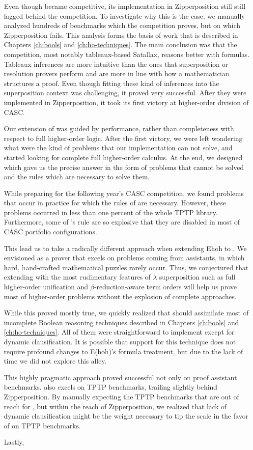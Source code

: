 Even though \lsup{} became competitive, its implementation in Zipperposition
still still lagged behind the competition. To investigate why this is the case,
we manually analyzed hundreds of benchmarks which the competition proves, but
on which Zipperposition fails. This analysis forms the basis of work that is
described in Chapters \ref{ch:bools} and \ref{ch:ho-techniques}. The main
conclusion was that the competition, most notably tableaux-based Satallax,
reasons better with formulas. Tableaux inferences are more intuitive than the
ones that superposition or resolution provers perform and are more in line with
how a mathematician structures a proof. Even though fitting these kind of
inferences into the superposition context was challenging, it proved very
successful. After they were implemented in Zipperposition, it took its first
victory at higher-order division of CASC.

Our extension of \lsup{} was guided by performance, rather than completeness
with respect to full higher-order logic. After the first victory, we were left
wondering what were the kind of problems that our implementation can not
solve, and started looking for complete full higher-order calculus. At the end,
we designed \osup{} which gave us the precise answer in the form of problems that
cannot be solved and the rules which are necessary to solve them. 

While preparing for the following year's CASC competition, we found problems
that occur in practice for which the rules of \osup{} are necessary. However,
these problems occurred in less than one percent of the whole TPTP library.
Furthermore, some of \osup{}'s rule are so explosive that they are disabled in
most of CASC portfolio configurations.

This lead us to take a radically different approach when extending Ehoh to
\ehohii{}. We envisioned \ehohii{} as a prover that excels on problems coming
from assistants, in which hard, hand-crafted mathematical puzzles rarely occur.
Thus, we conjectured that extending \lfsup{} with the most rudimentary features
of $\lambda$ superposition such as full higher-order unification and
$\beta$-reduction-aware term orders will help us prove most of higher-order
problems without the explosion of complete approaches.

While this proved mostly true, we quickly realized that \ehohii{} should
assimilate most of incomplete Boolean reasoning techniques described in Chapters
\ref{ch:bools} and \ref{ch:ho-techniques}. All of them were straightforward to
implement except for dynamic clausification. It is possible that support for
this technique does not require profound changes to E(hoh)'s formula treatment,
but due to the lack of time we did not explore this alley.

This highly pragmatic approach proved successful not only on proof assistant
benchmarks. \ehohii{} also excels on TPTP benchmarks, trailing slightly behind
Zipperposition. By manually expecting the TPTP benchmarks that are out of reach
for \ehohii{}, but within the reach of Zipperposition, we realized that lack of
dynamic clausification might be the weight necessary to tip the scale in the
favor of \ehohii{} on TPTP benchmarks.

Lastly, 
